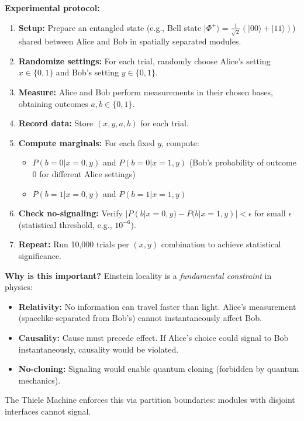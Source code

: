 \textbf{Experimental protocol:}
\begin{enumerate}
    \item \textbf{Setup:} Prepare an entangled state (e.g., Bell state $|\Phi^+\rangle = \frac{1}{\sqrt{2}}(|00\rangle + |11\rangle)$) shared between Alice and Bob in spatially separated modules.
    
    \item \textbf{Randomize settings:} For each trial, randomly choose Alice's setting $x \in \{0, 1\}$ and Bob's setting $y \in \{0, 1\}$.
    
    \item \textbf{Measure:} Alice and Bob perform measurements in their chosen bases, obtaining outcomes $a, b \in \{0, 1\}$.
    
    \item \textbf{Record data:} Store $(x, y, a, b)$ for each trial.
    
    \item \textbf{Compute marginals:} For each fixed $y$, compute:
    \begin{itemize}
        \item $P(b=0|x=0, y)$ and $P(b=0|x=1, y)$ (Bob's probability of outcome 0 for different Alice settings)
        \item $P(b=1|x=0, y)$ and $P(b=1|x=1, y)$
    \end{itemize}
    
    \item \textbf{Check no-signaling:} Verify $|P(b|x=0, y) - P(b|x=1, y)| < \epsilon$ for small $\epsilon$ (statistical threshold, e.g., $10^{-6}$).
    
    \item \textbf{Repeat:} Run 10,000 trials per $(x, y)$ combination to achieve statistical significance.
\end{enumerate}

\textbf{Why is this important?} Einstein locality is a \textit{fundamental constraint} in physics:
\begin{itemize}
    \item \textbf{Relativity:} No information can travel faster than light. Alice's measurement (spacelike-separated from Bob's) cannot instantaneously affect Bob.
    \item \textbf{Causality:} Cause must precede effect. If Alice's choice could signal to Bob instantaneously, causality would be violated.
    \item \textbf{No-cloning:} Signaling would enable quantum cloning (forbidden by quantum mechanics).
\end{itemize}
The Thiele Machine enforces this via partition boundaries: modules with disjoint interfaces cannot signal.

